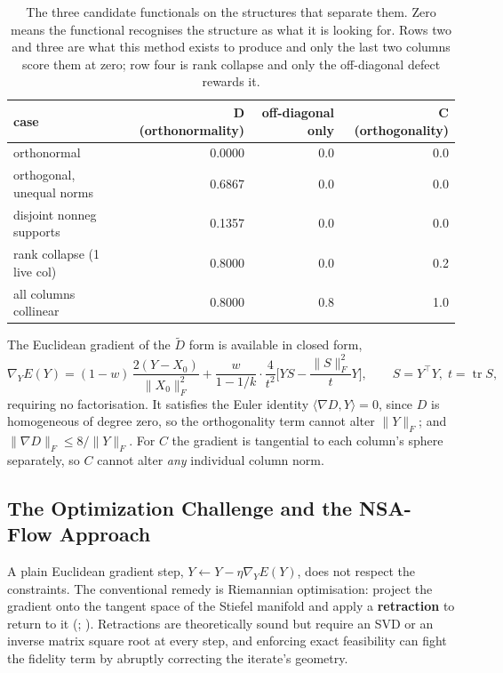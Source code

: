 \documentclass[
]{article}
\begin{document}
\begin{table}[!h]
\centering
\caption{\label{tab:props}The three candidate functionals on the structures that separate them. Zero means the functional recognises the structure as what it is looking for. Rows two and three are what this method exists to produce and only the last two columns score them at zero; row four is rank collapse and only the off-diagonal defect rewards it.}
\centering
\fontsize{9}{11}\selectfont
\begin{tabular}[t]{lrrr}
\toprule
case & D (orthonormality) & off-diagonal only & C (orthogonality)\\
\midrule
orthonormal & 0.0000 & 0.0 & 0.0\\
orthogonal, unequal norms & 0.6867 & 0.0 & 0.0\\
disjoint nonneg supports & 0.1357 & 0.0 & 0.0\\
rank collapse (1 live col) & 0.8000 & 0.0 & 0.2\\
all columns collinear & 0.8000 & 0.8 & 1.0\\
\bottomrule
\end{tabular}
\end{table}

The Euclidean gradient of the \(\tilde D\) form is available in closed form,
\[
\nabla_Y E(Y) = (1-w)\,\frac{2 (Y - X_0)}{\|X_0\|_F^2}
 + \frac{w}{1 - 1/k}\cdot\frac{4}{t^2}\Big[ Y S - \frac{\|S\|_F^2}{t} Y \Big],
\qquad S = Y^\top Y,\; t = \operatorname{tr} S,
\]
requiring no factorisation. It satisfies the Euler identity \(\langle \nabla D, Y\rangle = 0\), since \(D\) is homogeneous of degree zero, so the orthogonality term cannot alter \(\|Y\|_F\); and \(\|\nabla D\|_F \le 8 / \|Y\|_F\). For \(C\) the gradient is tangential to each column's sphere separately, so \(C\) cannot alter \emph{any} individual column norm.

\subsection{The Optimization Challenge and the NSA-Flow Approach}\label{the-optimization-challenge-and-the-nsa-flow-approach}

A plain Euclidean gradient step, \(Y \leftarrow Y - \eta \nabla_Y E(Y)\), does not respect the constraints. The conventional remedy is Riemannian optimisation: project the gradient onto the tangent space of the Stiefel manifold and apply a \textbf{retraction} to return to it (; ). Retractions are theoretically sound but require an SVD or an inverse matrix square root at every step, and enforcing exact feasibility can fight the fidelity term by abruptly correcting the iterate's geometry.
\end{document}
